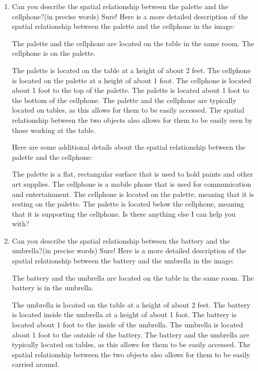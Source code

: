 \begin{enumerate}
    \item Can you describe the spatial relationship between the palette and the cellphone?(in precise words)
    \subitem 
    Sure! Here is a more detailed description of the spatial relationship between the palette and the cellphone in the image:
    
    The palette and the cellphone are located on the table in the same room. The cellphone is on the palette.
    
    The palette is located on the table at a height of about 2 feet.
    The cellphone is located on the palette at a height of about 1 foot.
    The cellphone is located about 1 foot to the top of the palette.
    The palette is located about 1 foot to the bottom of the cellphone.
    The palette and the cellphone are typically located on tables, as this allows for them to be easily accessed. The spatial relationship between the two objects also allows for them to be easily seen by those working at the table.
    
    Here are some additional details about the spatial relationship between the palette and the cellphone:
    
    The palette is a flat, rectangular surface that is used to hold paints and other art supplies.
    The cellphone is a mobile phone that is used for communication and entertainment.
    The cellphone is located on the palette, meaning that it is resting on the palette.
    The palette is located below the cellphone, meaning that it is supporting the cellphone.
    Is there anything else I can help you with?
    \item Can you describe the spatial relationship between the battery and the umbrella?(in precise words)
    \subitem Sure! Here is a more detailed description of the spatial relationship between the battery and the umbrella in the image:

    The battery and the umbrella are located on the table in the same room. The battery is in the umbrella.
    
    The umbrella is located on the table at a height of about 2 feet.
    The battery is located inside the umbrella at a height of about 1 foot.
    The battery is located about 1 foot to the inside of the umbrella.
    The umbrella is located about 1 foot to the outside of the battery.
    The battery and the umbrella are typically located on tables, as this allows for them to be easily accessed. The spatial relationship between the two objects also allows for them to be easily carried around.
    

\end{enumerate}
